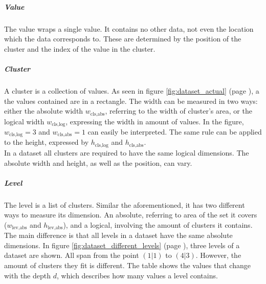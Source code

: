 \documentclass[10pt,a4paper,titlepage]{article}
\begin{document}
	\subparagraph{Value}
	The value wraps a single value. It contains no other data, not even the location which the data corresponds to. These are determined by the position of the cluster and the index of the value in the cluster.
	\subparagraph{Cluster}
	A cluster is a collection of values. As seen in figure \ref{fig:dataset_actual} (page \pageref{fig:dataset_actual}), a the values contained are in a rectangle. The width can be measured in two ways: either the absolute width \(w_{\text{cls,abs}}\), referring to the width of cluster's area, or the logical width \(w_{\text{cls,log}}\), expressing the width in amount of values. In the figure, \(w_{\text{cls,log}} = 3\) and \(w_{\text{cls,abs}} = 1\) can easily be interpreted. The same rule can be applied to the height, expressed by \(h_{\text{cls,log}}\) and \(h_{\text{cls,abs}}\).\\
	In a dataset all clusters are required to have the same logical dimensions. The absolute width and height, as well as the position, can vary.
	\subparagraph{Level}
	The level is a list of clusters. Similar the aforementioned, it has two different ways to measure its dimension. An absolute, referring to area of the set it covers (\(w_{\text{lev,abs}}\) and \(h_{\text{lev,abs}}\)), and a logical, involving the amount of clusters it contains. The main difference is that all levels in a dataset have the same absolute dimensions. In figure \ref{fig:dataset_different_levels} (page \pageref{fig:dataset_different_levels}), three levels of a dataset are shown. All span from the point \((1|1)\) to \((4|3)\). However, the amount of clusters they fit is different. The table shows the values that change with the depth \(d\), which describes how many values a level contains.
\end{document}
